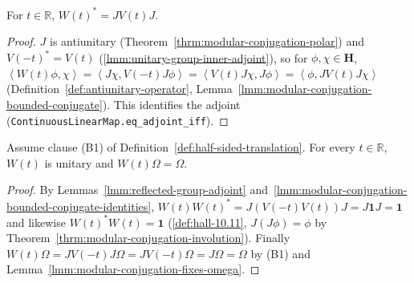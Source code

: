 \begin{lemma}
    \label{lmm:reflected-group-adjoint}
    \leanok
    For $t \in \mathbb{R}$, $W(t)^* = JV(t)J$.
\end{lemma}
\begin{proof}
    \leanok
    $J$ is antiunitary (Theorem~\ref{thrm:modular-conjugation-polar}) and $V(-t)^* = V(t)$ (\ref{lmm:unitary-group-inner-adjoint}), so for $\phi, \chi \in \mathbf{H}$, $\left< W(t)\phi, \chi \right> = \left< J\chi, V(-t)J\phi \right> = \left< V(t)J\chi, J\phi \right> = \left< \phi, JV(t)J\chi \right>$ (Definition~\ref{def:antiunitary-operator}, Lemma~\ref{lmm:modular-conjugation-bounded-conjugate}). This identifies the adjoint (\texttt{ContinuousLinearMap.eq\_adjoint\_iff}).
\end{proof}

\begin{lemma}
    \label{lmm:reflected-group-unitary}
    \leanok
    Assume clause (B1) of Definition~\ref{def:half-sided-translation}. For every $t \in \mathbb{R}$, $W(t)$ is unitary and $W(t)\Omega = \Omega$.
\end{lemma}
\begin{proof}
    \leanok
    By Lemmas~\ref{lmm:reflected-group-adjoint} and~\ref{lmm:modular-conjugation-bounded-conjugate-identities}, $W(t)W(t)^* = J(V(-t)V(t))J = J\mathbf{1}J = \mathbf{1}$ and likewise $W(t)^*W(t) = \mathbf{1}$ (\ref{def:hall-10.11}, $J(J\phi) = \phi$ by Theorem~\ref{thrm:modular-conjugation-involution}). Finally $W(t)\Omega = JV(-t)J\Omega = JV(-t)\Omega = J\Omega = \Omega$ by (B1) and Lemma~\ref{lmm:modular-conjugation-fixes-omega}.
\end{proof}

